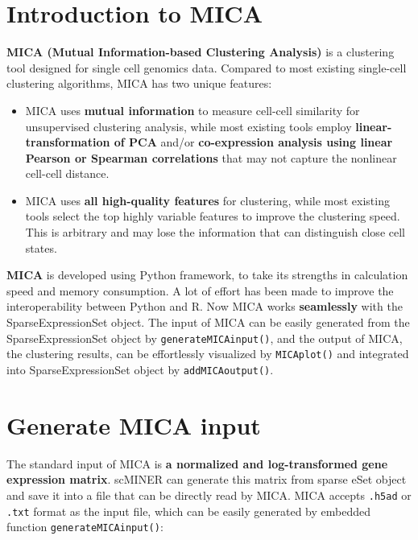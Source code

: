\documentclass[
  12pt,
]{book}
\providecommand{\tightlist}{%
  \setlength{\itemsep}{0pt}\setlength{\parskip}{0pt}}
\begin{document}
\section{Introduction to MICA}\label{introduction-to-mica}

\textbf{MICA (Mutual Information-based Clustering Analysis)} is a clustering tool designed for single cell genomics data. Compared to most existing single-cell clustering algorithms, MICA has two unique features:

\begin{itemize}
\tightlist
\item
  MICA uses \textbf{mutual information} to measure cell-cell similarity for unsupervised clustering analysis, while most existing tools employ \textbf{linear-transformation of PCA} and/or \textbf{co-expression analysis using linear Pearson or Spearman correlations} that may not capture the nonlinear cell-cell distance.
\item
  MICA uses \textbf{all high-quality features} for clustering, while most existing tools select the top highly variable features to improve the clustering speed. This is arbitrary and may lose the information that can distinguish close cell states.
\end{itemize}

\textbf{MICA} is developed using Python framework, to take its strengths in calculation speed and memory consumption. A lot of effort has been made to improve the interoperability between Python and R. Now MICA works \textbf{seamlessly} with the SparseExpressionSet object. The input of MICA can be easily generated from the SparseExpressionSet object by \texttt{generateMICAinput()}, and the output of MICA, the clustering results, can be effortlessly visualized by \texttt{MICAplot()} and integrated into SparseExpressionSet object by \texttt{addMICAoutput()}.

\section{Generate MICA input}\label{generate-mica-input}

The standard input of MICA is \textbf{a normalized and log-transformed gene expression matrix}. scMINER can generate this matrix from sparse eSet object and save it into a file that can be directly read by MICA. MICA accepts \texttt{.h5ad} or \texttt{.txt} format as the input file, which can be easily generated by embedded function \texttt{generateMICAinput()}:
\end{document}
